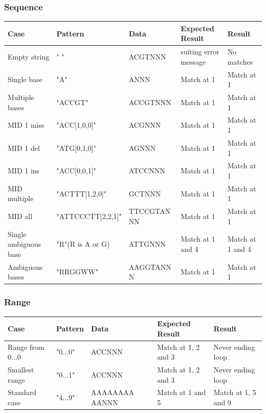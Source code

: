 \documentclass[12pt]{article}
\begin{document}
\subsubsection{Sequence}
\begin{table}[h]
\begin{tabular}{p{4cm}|p{3.6cm}|p{2.5cm}|p{2.2cm}|p{2.2cm}}
Case 			& Pattern & Data & Expected Result & Result \\ \hline
Empty string		& " " & ACGTNNN & suiting error message & No matches \\ \hline
Single base 		& "A" & ANNN & Match at 1 & Match at 1\\ \hline
Multiple bases	& "ACCGT" & ACCGTNNN & Match at 1 & Match at 1 \\ \hline
MID 1 miss		& "ACC[1,0,0]" & ACGNNN & Match at 1 & Match at 1\\ \hline
MID 1 del		& "ATG[0,1,0]" & AGNNN & Match at 1 & Match at 1 \\ \hline
MID 1 ins		& "ACC[0,0,1]" & ATCCNNN & Match at 1 & Match at 1\\ \hline
MID multiple		& "ACTTT[1,2,0]" & GCTNNN & Match at 1 & Match at 1\\ \hline
MID all			& "ATTCCCTT[2,2,1]" & TTCCGTAN NN & Match at 1 & Match at 1\\ \hline
Single ambiguous base & "R"(R is A or G) & ATTGNNN & Match at 1 and 4 & Match at 1 and 4 \\ \hline
Ambiguous bases	& "RRGGWW" & AAGGTANN N & Match at 1 & Match at 1
\end{tabular}
\end{table}

\subsubsection{Range}
\begin{table}[h]
\begin{tabular}{p{4cm}|p{3cm}|p{2.5cm}|p{2.5cm}|p{2.5cm}}
Case 			& Pattern & Data & Expected Result & Result \\ \hline
Range from 0...0	& "0...0" & ACCNNN & Match at 1, 2 and 3 & Never ending loop \\ \hline
Smallest range 	& "0...1" & ACCNNN & Match at 1, 2 and 3 & Never ending loop \\ \hline
Standard case	& "4...9" & AAAAAAAA AANNN & Match at 1 and 5 & Match at 1, 5 and 9
\end{tabular}
\end{table}
\end{document}
